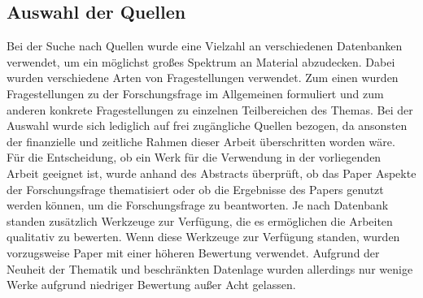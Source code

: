 \subsection{Auswahl der Quellen}
Bei der Suche nach Quellen wurde eine Vielzahl an verschiedenen Datenbanken verwendet, um ein möglichst großes 
Spektrum an Material abzudecken. Dabei wurden verschiedene Arten von Fragestellungen verwendet. Zum einen wurden 
Fragestellungen zu der Forschungsfrage im Allgemeinen formuliert und zum anderen konkrete Fragestellungen zu einzelnen 
Teilbereichen des Themas. Bei der Auswahl wurde sich lediglich auf frei zugängliche Quellen bezogen, da ansonsten der 
finanzielle und zeitliche Rahmen dieser Arbeit überschritten worden wäre. Für die Entscheidung, ob ein Werk für die 
Verwendung in der vorliegenden Arbeit geeignet ist, wurde anhand des Abstracts überprüft, ob das Paper Aspekte der 
Forschungsfrage thematisiert oder ob die Ergebnisse des Papers genutzt werden können, um die Forschungsfrage zu beantworten. 
Je nach Datenbank standen zusätzlich Werkzeuge zur Verfügung, die es ermöglichen die Arbeiten qualitativ zu bewerten. 
Wenn diese Werkzeuge zur Verfügung standen, wurden vorzugsweise Paper mit einer höheren Bewertung verwendet. Aufgrund der 
Neuheit der Thematik und beschränkten Datenlage wurden allerdings nur wenige Werke aufgrund niedriger Bewertung außer Acht gelassen.

